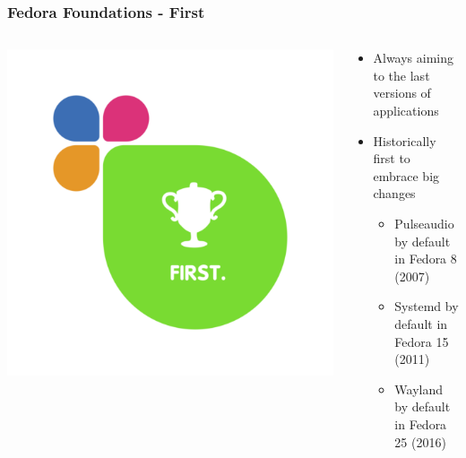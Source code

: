 \documentclass[t,aspectratio=169]{beamer}
\begin{document}
\begin{frame}
    \frametitle{Fedora Foundations - First}
    \begin{columns}[T] %
        \begin{column}{.5\textwidth}
            \includegraphics[width=\linewidth]{foundations_expand_4_first.png}
        \end{column}
        \begin{column}{.5\textwidth}
            \begin{itemize}
                \item<2-> Always aiming to the last versions of applications
                \item<3-> Historically first to embrace big changes
                \begin{itemize}
                    \item<4-> Pulseaudio by default in Fedora 8 (2007)
                    \item<5-> Systemd by default in Fedora 15 (2011)
                    \item<6-> Wayland by default in Fedora 25 (2016)
                \end{itemize}
            \end{itemize}
        \end{column}
    \end{columns}
\end{frame}
\end{document}
